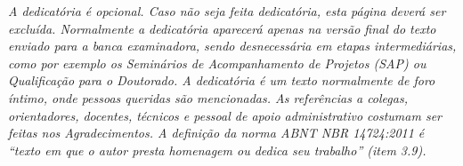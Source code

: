 \begin{dedicatoria}
   \vspace*{\fill}
   \centering
   \noindent
   \textit{ A dedicatória é opcional. Caso não seja feita dedicatória, esta página deverá ser excluída. Normalmente a dedicatória aparecerá apenas na versão final do texto enviado para a banca examinadora, sendo desnecessária em etapas intermediárias, como por exemplo os Seminários de Acompanhamento de Projetos (SAP) ou Qualificação para o Doutorado.
A dedicatória é um texto normalmente de foro íntimo, onde pessoas queridas são mencionadas. As referências a colegas, orientadores, docentes, técnicos e pessoal de apoio administrativo costumam ser feitas nos Agradecimentos.
A definição da norma ABNT NBR 14724:2011 é “texto em que o autor presta homenagem ou dedica seu trabalho” (item 3.9).
} \vspace*{\fill}
\end{dedicatoria}
